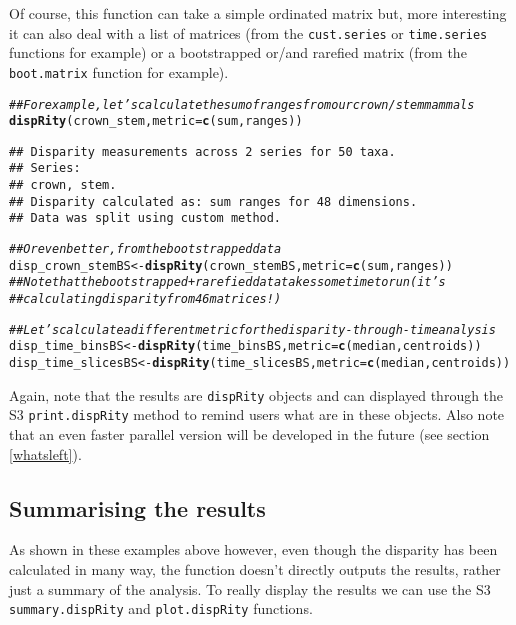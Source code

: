 \documentclass{article}\usepackage[]{graphicx}\usepackage[]{color}
\makeatletter
\newcommand{\hlcom}[1]{\textcolor[rgb]{0.678,0.584,0.686}{\textit{#1}}}%
\newcommand{\hlstd}[1]{\textcolor[rgb]{0.345,0.345,0.345}{#1}}%
\newcommand{\hlkwb}[1]{\textcolor[rgb]{0.69,0.353,0.396}{#1}}%
\newcommand{\hlkwc}[1]{\textcolor[rgb]{0.333,0.667,0.333}{#1}}%
\newcommand{\hlkwd}[1]{\textcolor[rgb]{0.737,0.353,0.396}{\textbf{#1}}}%
\newenvironment{kframe}{%
 \def\at@end@of@kframe{}%
 \ifinner\ifhmode%
  \def\at@end@of@kframe{\end{minipage}}%
  \begin{minipage}{\columnwidth}%
 \fi\fi%
 \def\FrameCommand##1{\hskip\@totalleftmargin \hskip-\fboxsep
 \colorbox{shadecolor}{##1}\hskip-\fboxsep
     \hskip-\linewidth \hskip-\@totalleftmargin \hskip\columnwidth}%
 \MakeFramed {\advance\hsize-\width
   \@totalleftmargin\z@ \linewidth\hsize
   \@setminipage}}%
 {\par\unskip\endMakeFramed%
 \at@end@of@kframe}
\newenvironment{knitrout}{}{} %
\newcommand{\dispRity}{\texttt{dispRity} }
\makeatother
\begin{document}
Of course, this function can take a simple ordinated matrix but, more interesting it can also deal with a list of matrices (from the \texttt{cust.series} or \texttt{time.series} functions for example) or a bootstrapped or/and rarefied matrix (from the \texttt{boot.matrix} function for example).

\begin{knitrout}
\color{fgcolor}\begin{kframe}
\begin{alltt}
\hlcom{## For example, let's calculate the sum of ranges from our crown/stem mammals}
\hlkwd{dispRity}\hlstd{(crown_stem,} \hlkwc{metric} \hlstd{=} \hlkwd{c}\hlstd{(sum, ranges))}
\end{alltt}
\begin{verbatim}
## Disparity measurements across 2 series for 50 taxa. 
## Series:
## crown, stem.
## Disparity calculated as: sum ranges for 48 dimensions.
## Data was split using custom method.
\end{verbatim}
\begin{alltt}
\hlcom{## Or even better, from the bootstrapped data}
\hlstd{disp_crown_stemBS} \hlkwb{<-} \hlkwd{dispRity}\hlstd{(crown_stemBS,} \hlkwc{metric} \hlstd{=} \hlkwd{c}\hlstd{(sum, ranges))}
\hlcom{## Note that the bootstrapped + rarefied data takes some time to run (it's}
\hlcom{## calculating disparity from 46 matrices!)}

\hlcom{## Let's calculate a different metric for the disparity-through-time analysis}
\hlstd{disp_time_binsBS} \hlkwb{<-} \hlkwd{dispRity}\hlstd{(time_binsBS,} \hlkwc{metric} \hlstd{=} \hlkwd{c}\hlstd{(median, centroids))}
\hlstd{disp_time_slicesBS} \hlkwb{<-} \hlkwd{dispRity}\hlstd{(time_slicesBS,} \hlkwc{metric} \hlstd{=} \hlkwd{c}\hlstd{(median, centroids))}
\end{alltt}
\end{kframe}
\end{knitrout}

Again, note that the results are \dispRity objects and can displayed through the S3 \texttt{print.dispRity} method to remind users what are in these objects.
Also note that an even faster parallel version will be developed in the future (see section \ref{whatsleft}).

\subsection{Summarising the results}
As shown in these examples above however, even though the disparity has been calculated in many way, the function doesn't directly outputs the results, rather just a summary of the analysis.
To really display the results we can use the S3 \texttt{summary.dispRity} and \texttt{plot.dispRity} functions.
\end{document}
